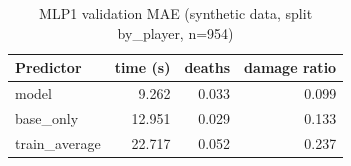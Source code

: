\begin{table}[ht]
\centering
\small
\begin{tabular}{lrrr}
\toprule
Predictor & time (s) & deaths & damage ratio \\
\midrule
model & 9.262 & 0.033 & 0.099 \\
base\_only & 12.951 & 0.029 & 0.133 \\
train\_average & 22.717 & 0.052 & 0.237 \\
\bottomrule
\end{tabular}
\caption{MLP1 validation MAE (synthetic data, split by\_player, n=954)}
\label{tab:mlp1_accuracy}
\end{table}
